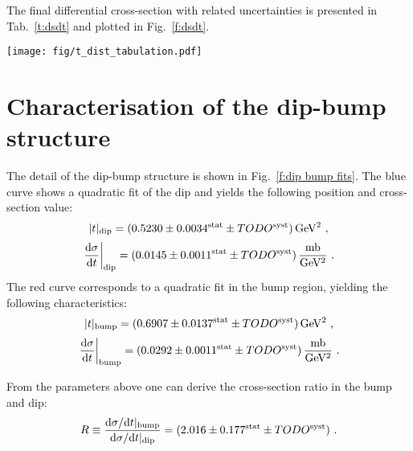 \documentclass[doublecol]{epl/epl2}
\def\d{{\rm d}}
\def\un#1{\,{\rm #1}}
\begin{document}


The final differential cross-section with related uncertainties is presented in Tab.~\ref{t:dsdt} and plotted in Fig.~\ref{f:dsdt}.

\begin{figure*}
\begin{center}
\texttt{[image: fig/t\_dist\_tabulation.pdf]}
\vskip-5mm
\caption{Differential cross-section from Tab.~\ref{t:dsdt}.}
\label{f:dsdt}
\end{center}
\end{figure*}


\section{Characterisation of the dip-bump structure}
\label{s:dip-bump}

The detail of the dip-bump structure is shown in Fig.~\ref{f:dip bump fits}. The blue curve shows a quadratic fit of the dip and yields the following position and cross-section value:
\begin{equation}
\label{e:t dip}
|t|_{\rm dip} = (0.5230 \pm 0.0034^{\rm stat} \pm TODO^{\rm syst})\un{GeV^2}\ ,
\end{equation}
\begin{equation}
\label{e:dsdt dip}
\left.{\d\sigma\over\d t}\right|_{\rm dip} = (0.0145 \pm 0.0011^{\rm stat} \pm TODO^{\rm syst})\un{{mb\over GeV^2}}\ .
\end{equation}
The red curve corresponds to a quadratic fit in the bump region, yielding the following characteristics:
\begin{equation}
\label{e:t bump}
|t|_{\rm bump} = (0.6907 \pm 0.0137^{\rm stat} \pm TODO^{\rm syst})\un{GeV^2}\ ,
\end{equation}
\begin{equation}
\label{e:dsdt bump}
\left.{\d\sigma\over\d t}\right|_{\rm bump} = (0.0292 \pm 0.0011^{\rm stat} \pm TODO^{\rm syst})\un{{mb\over GeV^2}}\ .
\end{equation}

From the parameters above one can derive the cross-section ratio in the bump and dip:
\begin{equation}
\label{e:R}
R \equiv {{\d\sigma/\d t}|_{\rm bump} \over {\d\sigma/\d t}|_{\rm dip}} = (2.016 \pm 0.177^{\rm stat} \pm TODO^{\rm syst})\ .
\end{equation}
\end{document}
